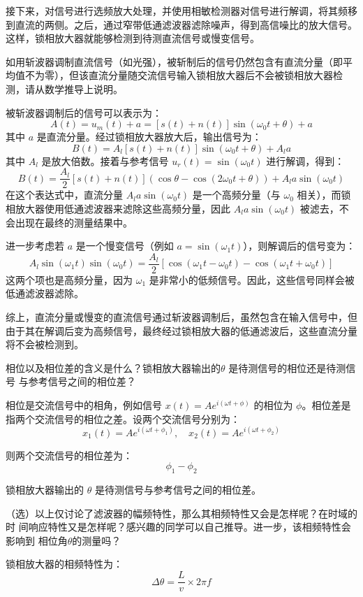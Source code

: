 \documentclass[dvipsnames, svgnames,a4paper,11pt]{article}
\begin{document}
接下来，对信号进行选频放大处理，并使用相敏检测器对信号进行解调，将其频移到直流的两侧。之后，通过窄带低通滤波器滤除噪声，得到高信噪比的放大信号。这样，锁相放大器就能够检测到待测直流信号或慢变信号。

	\begin{question}
		如用斩波器调制直流信号（如光强），被斩制后的信号仍然包含有直流分量（即平均值不为零），但该直流分量随交流信号输入锁相放大器后不会被锁相放大器检测，请从数学推导上说明。
		\end{question}
		
		被斩波器调制后的信号可以表示为：
		\[
		A(t) = u_m(t) + a = [s(t) + n(t)] \sin(\omega_0 t + \theta) + a
		\]
		其中 \(a\) 是直流分量。经过锁相放大器放大后，输出信号为：
		\[
		B(t) = A_l [s(t) + n(t)] \sin(\omega_0 t + \theta) + A_l a
		\]
		其中 \(A_l\) 是放大倍数。接着与参考信号 \(u_r(t) = \sin(\omega_0 t)\) 进行解调，得到：
		\[
		B(t) = \frac{A_l}{2} [s(t) + n(t)] (\cos \theta - \cos(2 \omega_0 t + \theta)) + A_l a \sin(\omega_0 t)
		\]
		在这个表达式中，直流分量 \(A_l a \sin(\omega_0 t)\) 是一个高频分量（与 \(\omega_0\) 相关），而锁相放大器使用低通滤波器来滤除这些高频分量，因此 \(A_l a \sin(\omega_0 t)\) 被滤去，不会出现在最终的测量结果中。
		
		进一步考虑若 \(a\) 是一个慢变信号（例如 \(a = \sin(\omega_1 t)\)），则解调后的信号变为：
		\[
		A_l \sin(\omega_1 t) \sin(\omega_0 t) = \frac{A_l}{2} [\cos(\omega_1 t - \omega_0 t) - \cos(\omega_1 t + \omega_0 t)]
		\]
		这两个项也是高频分量，因为 \(\omega_1\) 是非常小的低频信号。因此，这些信号同样会被低通滤波器滤除。
		
		综上，直流分量或慢变的直流信号通过斩波器调制后，虽然包含在输入信号中，但由于其在解调后变为高频信号，最终经过锁相放大器的低通滤波后，这些直流分量将不会被检测到。
	\begin{question}
		相位以及相位差的含义是什么？锁相放大器输出的\(\theta\) 是待测信号的相位还是待测信号
与参考信号之间的相位差？
	\end{question}
	相位是交流信号中的相角，例如信号 \(x(t) = A e^{i(\omega t + \phi)}\) 的相位为 \(\phi\)。相位差是指两个交流信号的相位之差。设两个交流信号分别为：
	\[
	x_1(t) = A e^{i(\omega t + \phi_1)}, \quad x_2(t) = A e^{i(\omega t + \phi_2)}
	\]

	则两个交流信号的相位差为：
	\[
	\phi_1 - \phi_2
	\]

	锁相放大器输出的 \(\theta\) 是待测信号与参考信号之间的相位差。

	\begin{question}
		（选）以上仅讨论了滤波器的幅频特性，那么其相频特性又会是怎样呢？在时域的时
间响应特性又是怎样呢？感兴趣的同学可以自己推导。进一步，该相频特性会影响到
相位角$\theta$的测量吗？
	\end{question}
	锁相放大器的相频特性为：
	\[
	\Delta \theta = \frac{L}{v} \times 2\pi f
	\]
\end{document}
